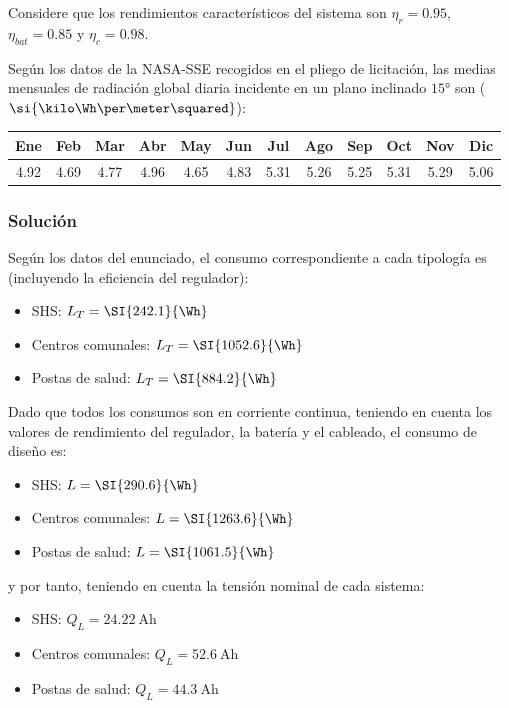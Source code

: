 Considere que los rendimientos característicos del sistema son
$\eta_{r}=0.95$, $\eta_{bat}=0.85$ y $\eta_{c}=0.98$.

Según los datos de la NASA-SSE recogidos en el pliego de licitación,
las medias mensuales de radiación global diaria incidente en un plano
inclinado $\ang{15}$ son ($\si{\kilo\Wh\per\meter\squared}$):

\begin{tabular}[center]{cccccccccccc}
  \toprule
  Ene & Feb & Mar & Abr & May & Jun & Jul & Ago & Sep & Oct & Nov &
  Dic\\
  \midrule
  4.92 & 4.69 & 4.77 & 4.96 & 4.65 & 4.83 & 5.31 & 5.26 & 5.25 & 5.31 &
  5.29 & 5.06\\
  \bottomrule
\end{tabular}


\subsubsection{Solución}


Según los datos del enunciado, el consumo correspondiente a cada
tipología es (incluyendo la eficiencia del regulador):
\begin{itemize}
\item SHS: $L_T=\SI{242.1}{\Wh}$
\item Centros comunales: $L_T=\SI{1052.6}{\Wh}$
\item Postas de salud: $L_T=\SI{884.2}{\Wh}$
\end{itemize}

Dado que todos los consumos son en corriente continua, teniendo en
cuenta los valores de rendimiento del regulador, la batería y el
cableado, el consumo de diseño es:
\begin{itemize}
\item SHS: $L=\SI{290.6}{\Wh}$
\item Centros comunales: $L=\SI{1263.6}{\Wh}$
\item Postas de salud: $L=\SI{1061.5}{\Wh}$
\end{itemize}
y por tanto, teniendo en cuenta la tensión nominal de cada sistema:

\begin{itemize}
\item SHS: $Q_L=\SI{24.22}{\ampere\hour}$
\item Centros comunales: $Q_L=\SI{52.6}{\ampere\hour}$
\item Postas de salud: $Q_L=\SI{44.3}{\ampere\hour}$
\end{itemize}

